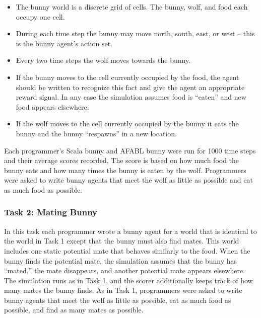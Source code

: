 \begin{itemize}

\item The bunny world is a discrete grid of cells.  The bunny, wolf, and food each occupy one cell.

\item During each time step the bunny may move north, south, east, or west -- this is the bunny agent's action set.

\item Every two time steps the wolf moves towards the bunny.

\item If the bunny moves to the cell currently occupied by the food, the agent should be written to recognize this fact and give the agent an appropriate reward signal. In any case the simulation assumes food is ``eaten'' and new food appears elsewhere.

\item If the wolf moves to the cell currently occupied by the bunny it eats the bunny and the bunny ``respawns'' in a new location.

\end{itemize}

Each programmer's Scala bunny and AFABL bunny were run for 1000 time steps and their average scores recorded. The score is based on how much food the bunny eats and how many times the bunny is eaten by the wolf.  Programmers were asked to write bunny agents that meet the wolf as little as possible and eat as much food as possible.

\subsubsection{Task 2: Mating Bunny}\label{sec:task2}

In this task each programmer wrote a bunny agent for a world that is identical to the world in Task 1 except that the bunny must also find mates.  This world includes one static  potential mate that behaves similarly to the food.  When the bunny finds the potential mate, the simulation assumes that the bunny has ``mated,'' the mate disappears, and another potential mate appears elsewhere.  The simulation runs as in Task 1, and the scorer additionally keeps track of how many mates the bunny finds.  As in Task 1, programmers were asked to write bunny agents that meet the wolf as little as possible, eat as much food as possible, and find as many mates as possible.

